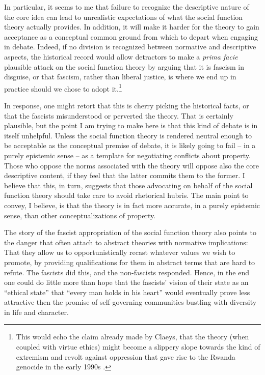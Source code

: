\documentclass[12pt,a4paper]{book} %
\begin{document}
In particular, it seems to me that failure to recognize the descriptive nature of the core idea can lead to unrealistic expectations of what the social function theory actually provides. In addition, it will make it harder for the theory to gain acceptance as a conceptual common ground from which to depart when engaging in debate. Indeed, if no division is recognized between normative and descriptive aspects, the historical record would allow detractors to make a {\it prima facie} plausible attack on the social function theory by arguing that it is fascism in disguise, or that fascism, rather than liberal justice, is where we end up in practice should we chose to adopt it.\footnote{This would echo the claim already made by Claeys, that the theory (when coupled with virtue ethics) might become a slippery slope towards the kind of extremism and revolt against oppression that gave rise to the Rwanda genocide in the early 1990s \cite[926-927]{claeys09}.}

In response, one might retort that this is cherry picking the historical facts, or that the fascists misunderstood or perverted the theory. That is certainly plausible, but the point I am trying to make here is that this kind of debate is in itself unhelpful. Unless the social function theory is rendered neutral enough to be acceptable as the conceptual premise of debate, it is likely going to fail -- in a purely epistemic sense -- as a template for negotiating conflicts about property. Those who oppose the norms associated with the theory will oppose also the core descriptive content, if they feel that the latter commits them to the former. I believe that this, in turn, suggests that those advocating on behalf of the social function theory should take care to avoid rhetorical hubris. The main point to convey, I believe, is that the theory is in fact more accurate, in a purely epistemic sense, than other conceptualizations of property.

The story of the fascist appropriation of the social function theory also points to the danger that often attach to abstract theories with normative implications: That they allow us to opportunistically recast whatever values we wish to promote, by providing qualifications for them in abstract terms that are hard to refute. The fascists did this, and the non-fascists responded. Hence, in the end one could do little more than hope that the fascists' vision of their state as an ``ethical state'' that ``every man holds in his heart'' would eventually prove less attractive then the promise of self-governing communities bustling with diversity in life and character.
\end{document}
